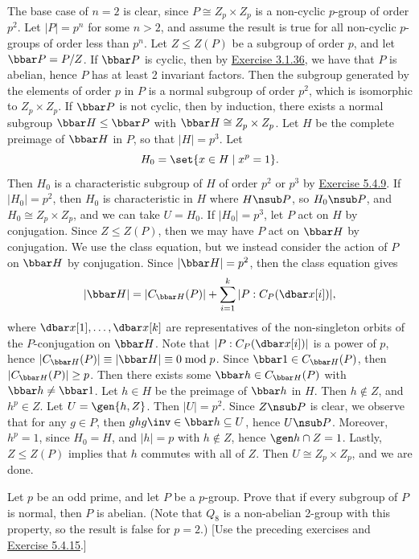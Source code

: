 \begin{sol}
    The base case of $n = 2$ is clear, since $P \cong Z_p \times Z_p$ is a non-cyclic $p$-group of order $p^2$. Let $|P| = p^n$ for some $n > 2$, and assume the result is true for all non-cyclic $p$-groups of order less than $p^n$. Let $Z \leq Z(P)$ be a subgroup of order $p$, and let $\bbar P = P/Z$. If $\bbar P$ is cyclic, then by \hyperref[ex3.1.36]{Exercise 3.1.36}, we have that $P$ is abelian, hence $P$ has at least 2 invariant factors. Then the subgroup generated by the elements of order $p$ in $P$ is a normal subgroup of order $p^2$, which is isomorphic to $Z_p \times Z_p$. If $\bbar P$ is not cyclic, then by induction, there exists a normal subgroup $\bbar H \leq \bbar P$ with $\bbar H \cong Z_p \times Z_p$. Let $H$ be the complete preimage of $\bbar H$ in $P$, so that $|H| = p^3$. Let
    \[H_0 = \set{x \in H \mid x^p = 1}.\]
    Then $H_0$ is a characteristic subgroup of $H$ of order $p^2$ or $p^3$ by \hyperref[ex5.4.9]{Exercise 5.4.9}. If $|H_0| = p^2$, then $H_0$ is characteristic in $H$ where $H \nsub P$, so $H_0 \nsub P$, and $H_0 \cong Z_p \times Z_p$, and we can take $U = H_0$. If $|H_0| = p^3$, let $P$ act on $H$ by conjugation. Since $Z \leq Z(P)$, then we may have $P$ act on $\bbar H$ by conjugation. We use the class equation, but we instead consider the action of $P$ on $\bbar H$ by conjugation. Since $|\bbar H| = p^2$, then the class equation gives
    \[|\bbar H| = |C_{\bbar H}(P)| + \sum_{i = 1}^k |P : C_P(\dbar x[i])|,\]
    where $\dbar x[1], \ldots, \dbar x[k]$ are representatives of the non-singleton orbits of the $P$-conjugation on $\bbar H$. Note that $|P : C_P(\dbar x[i])|$ is a power of $p$, hence $|C_{\bbar H}(P)| \equiv |\bbar H| \equiv 0 \bmod p$. Since $\bbar 1 \in C_{\bbar H}(P)$, then $|C_{\bbar H}(P)| \geq p$. Then there exists some $\bbar h \in C_{\bbar H}(P)$ with $\bbar h \neq \bbar 1$. Let $h \in H$ be the preimage of $\bbar h$ in $H$. Then $h \notin Z$, and $h^p \in Z$. Let $U = \gen{h, Z}$. Then $|U| = p^2$. Since $Z \nsub P$ is clear, we observe that for any $g \in P$, then $ghg\inv \in \bbar h \subseteq U$, hence $U \nsub P$. Moreover, $h^p = 1$, since $H_0 = H$, and $|h| = p$ with $h \not\in Z$, hence $\gen h \cap Z = 1$. Lastly, $Z \leq Z(P)$ implies that $h$ commutes with all of $Z$. Then $U \cong Z_p \times Z_p$, and we are done.
\end{sol}

\begin{exercise}\label{ex5.5.21}
    Let $p$ be an odd prime, and let $P$ be a $p$-group. Prove that if every subgroup of $P$ is normal, then $P$ is abelian. (Note that $Q_8$ is a non-abelian 2-group with this property, so the result is false for $p = 2$.) [Use the preceding exercises and \hyperref[ex5.4.15]{Exercise 5.4.15}.]
\end{exercise}

